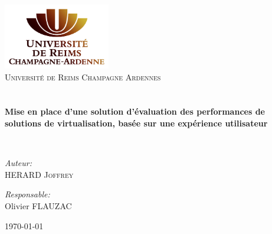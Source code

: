 \begin{titlepage}
\begin{center}

\includegraphics[width=0.35\textwidth]{./logo}~\\[1cm]

\textsc{\LARGE Université de Reims Champagne Ardennes}\\[1.5cm]

\textsc{\Large }\\[0.5cm]

\HRule \\[0.4cm]

{\huge \bfseries  
Mise en place d'une solution d'évaluation des performances de solutions de virtualisation, basée sur une expérience utilisateur\\[0.4cm] }

\HRule \\[1.5cm]

\begin{minipage}{0.4\textwidth}
\begin{flushleft} \large
\emph{Auteur:}\\
HERARD \textsc{Joffrey}\\
\end{flushleft}
\end{minipage}
\begin{minipage}{0.4\textwidth}
\begin{flushright} \large
\emph{Responsable:} \\
Olivier \textsc{FLAUZAC}\\
\end{flushright}
\end{minipage}

\vfill

{\large \today}

\end{center}
\end{titlepage}
